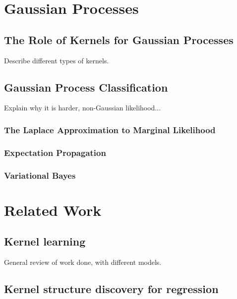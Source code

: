 \documentclass[a4paper,12pt ]{report}
\begin{document}

\chapter{Gaussian Processes}

\section{The Role of Kernels for Gaussian Processes}

Describe different types of kernels. 

\section{Gaussian Process Classification}

Explain why it is harder, non-Gaussian likelihood...

\subsection{The Laplace Approximation to Marginal Likelihood}

\subsection{Expectation Propagation}

\subsection{Variational Bayes}

\clearpage

\chapter{Related Work} 

\section{Kernel learning}

General review of work done, with different models.

\section{Kernel structure discovery for regression}
\end{document}
